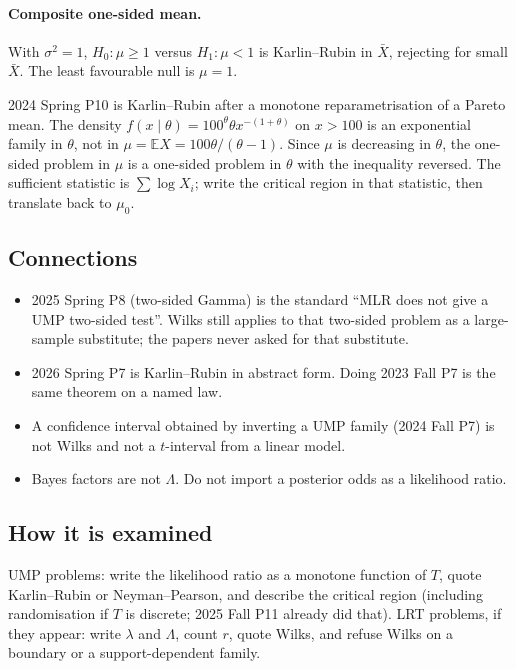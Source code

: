 \paragraph{Composite one-sided mean.}
With \(\sigma^{2}=1\), \(H_{0}:\mu\ge 1\) versus \(H_{1}:\mu<1\) is Karlin--Rubin in \(\bar X\), rejecting for small \(\bar X\). The least favourable null is \(\mu=1\).

2024 Spring P10 is Karlin--Rubin after a monotone reparametrisation of a Pareto mean. The density \(f(x\mid\theta)=100^{\theta}\theta x^{-(1+\theta)}\) on \(x>100\) is an exponential family in \(\theta\), not in \(\mu=\mathbb{E}X=100\theta/(\theta-1)\). Since \(\mu\) is decreasing in \(\theta\), the one-sided problem in \(\mu\) is a one-sided problem in \(\theta\) with the inequality reversed. The sufficient statistic is \(\sum\log X_{i}\); write the critical region in that statistic, then translate back to \(\mu_{0}\).

\subsection{Connections}

\begin{itemize}
    \item 2025 Spring P8 (two-sided Gamma) is the standard ``MLR does not give a UMP two-sided test''. Wilks still applies to that two-sided problem as a large-sample substitute; the papers never asked for that substitute.
    \item 2026 Spring P7 is Karlin--Rubin in abstract form. Doing 2023 Fall P7 is the same theorem on a named law.
    \item A confidence interval obtained by inverting a UMP family (2024 Fall P7) is not Wilks and not a \(t\)-interval from a linear model.
    \item Bayes factors are not \(\Lambda\). Do not import a posterior odds as a likelihood ratio.
\end{itemize}

\subsection{How it is examined}

UMP problems: write the likelihood ratio as a monotone function of \(T\), quote Karlin--Rubin or Neyman--Pearson, and describe the critical region (including randomisation if \(T\) is discrete; 2025 Fall P11 already did that). LRT problems, if they appear: write \(\lambda\) and \(\Lambda\), count \(r\), quote Wilks, and refuse Wilks on a boundary or a support-dependent family.

